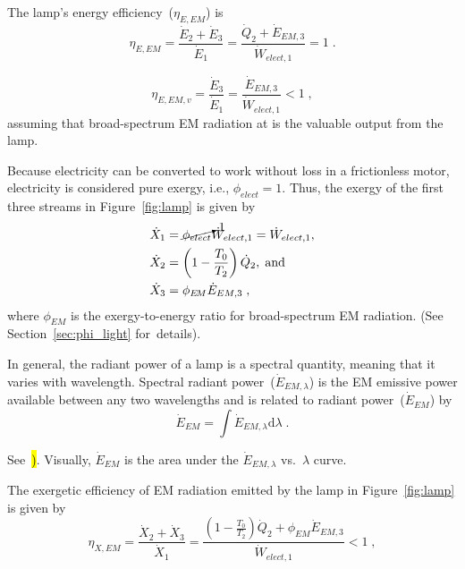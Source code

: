 \documentclass[energies,article,accept,moreauthors,pdftex]{Definitions/mdpi}\usepackage[]{graphicx}\usepackage[]{color}
\newcommand{\EM}{E \! M}
\begin{document}
The lamp's energy efficiency~($\eta_{E,EM}$) is 
\begin{equation}  
  \eta_{E,EM} = \frac{\dot{E}_2 + \dot{E}_3}{\dot{E}_1} = \frac{\dot{Q}_2 + \dot{E}_{EM,3}}{\dot{W}_{elect,1}} = 1 \; .
\end{equation}

\begin{equation} \label{eq:eta_E_v}
  \eta_{E,EM,v} = \frac{\dot{E}_3}{\dot{E}_1} = \frac{\dot{E}_{EM,3}}{\dot{W}_{elect,1}} < 1 \; ,
\end{equation}
%
assuming that broad-spectrum EM radiation at  is the valuable output from the lamp.

Because electricity can be converted to work without loss in a frictionless motor,
electricity is considered pure exergy, i.e., $\phi_{elect} = 1$.
Thus, the exergy of the first three streams in Figure~\ref{fig:lamp} is given by 
\begin{align}
  \dot{X}_1 &= \cancelto{1}{\phi_{elect}} \dot{W}_{elect,1} = \dot{W}_{elect,1}, \\
  \dot{X}_2 &= \left( 1 - \frac{T_0}{T_2} \right) \dot{Q}_2, \; \text{and} \\
  \dot{X}_3 &= \phi_{\EM} \dot{E}_{EM,3} \; ,
\end{align}
%
where $\phi_{EM}$ is the exergy-to-energy ratio for broad-spectrum EM radiation. 
(See Section~\ref{sec:phi_light} \mbox{for details}).

In general, the radiant power of a lamp is a spectral quantity,
meaning that it varies with wavelength.
Spectral radiant power~($\dot{E}_{EM,\lambda}$)
is the EM emissive power available between any two wavelengths
and is related to radiant power~($\dot{E}_{EM}$) by
\begin{equation} \label{eq:emissive_power}
  \dot{E}_{EM} = \int \dot{E}_{EM,\lambda} \mathrm{d}\lambda \; .
\end{equation}


See~\citet{benenson2006handbook}\hl{)}. Visually, $\dot{E}_{EM}$ is the area under the $\dot{E}_{EM,\lambda}$ vs.\ $\lambda$ curve.%

The exergetic efficiency of EM radiation emitted by the lamp in Figure~\ref{fig:lamp} is given by
\begin{equation}
  \eta_{X,EM} = \frac{\dot{X}_2 + \dot{X}_3}{\dot{X}_1} 
          = \frac{\left( 1 - \frac{T_0}{T_2} \right) \dot{Q}_2 + \phi_{EM} \dot{E}_{EM,3} }{\dot{W}_{elect,1}} < 1 \; ,
\end{equation}
\end{document}
